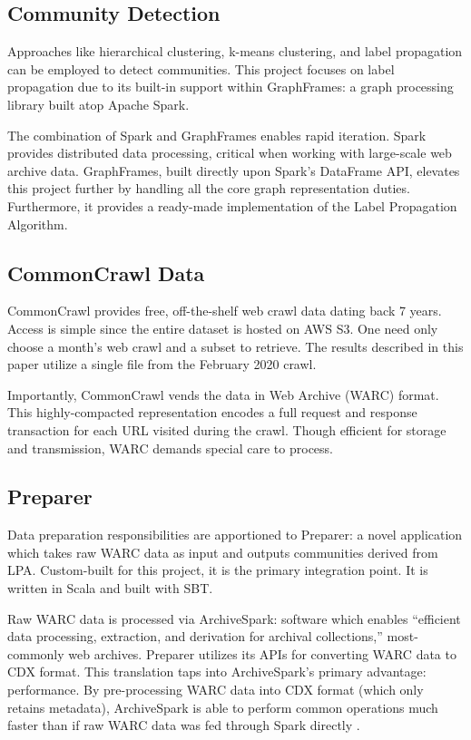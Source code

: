 \documentclass[conference]{IEEEtran}
\begin{document}
\subsection{Community Detection}

Approaches like hierarchical clustering, k-means clustering, and label propagation can be employed to detect communities. This project focuses on label propagation due to its built-in support within GraphFrames: a graph processing library built atop Apache Spark.

The combination of Spark and GraphFrames enables rapid iteration. Spark provides distributed data processing, critical when working with large-scale web archive data. GraphFrames, built directly upon Spark's DataFrame API, elevates this project further by handling all the core graph representation duties. Furthermore, it provides a ready-made implementation of the Label Propagation Algorithm.

\subsection{CommonCrawl Data}

CommonCrawl\cite{commonCrawl} provides free, off-the-shelf web crawl data dating back 7 years. Access is simple since the entire dataset is hosted on AWS S3. One need only choose a month's web crawl and a subset to retrieve. The results described in this paper utilize a single file from the February 2020 crawl.

Importantly, CommonCrawl vends the data in Web Archive (WARC) format. This highly-compacted representation encodes a full request and response transaction for each URL visited during the crawl. Though efficient for storage and transmission, WARC demands special care to process.

\subsection{Preparer}

Data preparation responsibilities are apportioned to Preparer: a novel application which takes raw WARC data as input and outputs communities derived from LPA. Custom-built for this project, it is the primary integration point. It is written in Scala and built with SBT.

Raw WARC data is processed via ArchiveSpark: software which enables ``efficient data processing, extraction, and derivation for archival collections,''\cite{archiveSpark} most-commonly web archives. Preparer utilizes its APIs for converting WARC data to CDX format. This translation taps into ArchiveSpark's primary advantage: performance. By pre-processing WARC data into CDX format (which only retains metadata), ArchiveSpark is able to perform common operations much faster than if raw WARC data was fed through Spark directly \cite{generatingCdx}.
\end{document}
